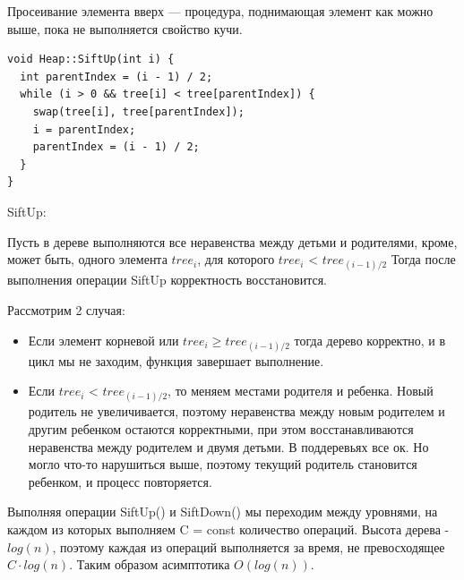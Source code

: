 \Def Просеивание элемента вверх — процедура, поднимающая элемент
как можно выше, пока не выполняется свойство кучи.

\begin{lstlisting}
void Heap::SiftUp(int i) {
  int parentIndex = (i - 1) / 2;
  while (i > 0 && tree[i] < tree[parentIndex]) {
    swap(tree[i], tree[parentIndex]);
    i = parentIndex;
    parentIndex = (i - 1) / 2;
  }
}
\end{lstlisting}

\Correctness SiftUp:

Пусть в дереве выполняются все неравенства между детьми и родителями, кроме, может быть, одного элемента $tree_i$, для которого  $tree_i$ < $tree_{(i-1)/2}$ Тогда после выполнения операции SiftUp корректность восстановится.


Рассмотрим 2 случая:
\begin{itemize}
    \item Если элемент корневой или $tree_{i} \geq tree_{(i-1)/2}$ тогда дерево корректно, и в цикл мы не заходим, функция завершает выполнение.
    \item Если $tree_{i}$ < $tree_{(i-1)/2}$, то меняем местами родителя и ребенка. Новый родитель не увеличивается, поэтому неравенства между новым родителем и другим ребенком остаются корректными, при этом восстанавливаются неравенства между родителем и двумя детьми. В поддеревьях все ок. Но могло что-то нарушиться выше, поэтому текущий родитель становится ребенком, и процесс повторяется. \Endproof
\end{itemize} 

Выполняя операции SiftUp() и SiftDown() мы переходим между уровнями, на каждом из которых выполняем C = const количество операций. Высота дерева - $log(n)$, поэтому каждая из операций выполняется за время, не превосходящее $C \cdot log(n)$. Таким образом асимптотика $O(log(n))$.

\pagebreak